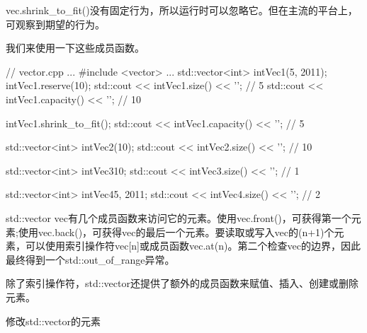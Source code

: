 vec.shrink\_to\_fit()没有固定行为，所以运行时可以忽略它。但在主流的平台上，可观察到期望的行为。

我们来使用一下这些成员函数。


\begin{cpp}
// vector.cpp
...
#include <vector>
...
std::vector<int> intVec1(5, 2011);
intVec1.reserve(10);
std::cout << intVec1.size() << '\n'; // 5
std::cout << intVec1.capacity() << '\n'; // 10

intVec1.shrink_to_fit();
std::cout << intVec1.capacity() << '\n'; // 5

std::vector<int> intVec2(10);
std::cout << intVec2.size() << '\n'; // 10

std::vector<int> intVec3{10};
std::cout << intVec3.size() << '\n'; // 1

std::vector<int> intVec4{5, 2011};
std::cout << intVec4.size() << '\n'; // 2
\end{cpp}

std::vector vec有几个成员函数来访问它的元素。使用vec.front()，可获得第一个元素;使用vec.back()，可获得vec的最后一个元素。要读取或写入vec的(n+1)个元素，可以使用索引操作符vec[n]或成员函数vec.at(n)。第二个检查vec的边界，因此最终得到一个std::out\_of\_range异常。

除了索引操作符，std::vector还提供了额外的成员函数来赋值、插入、创建或删除元素。

\begin{center}
修改std::vector的元素
\end{center}

